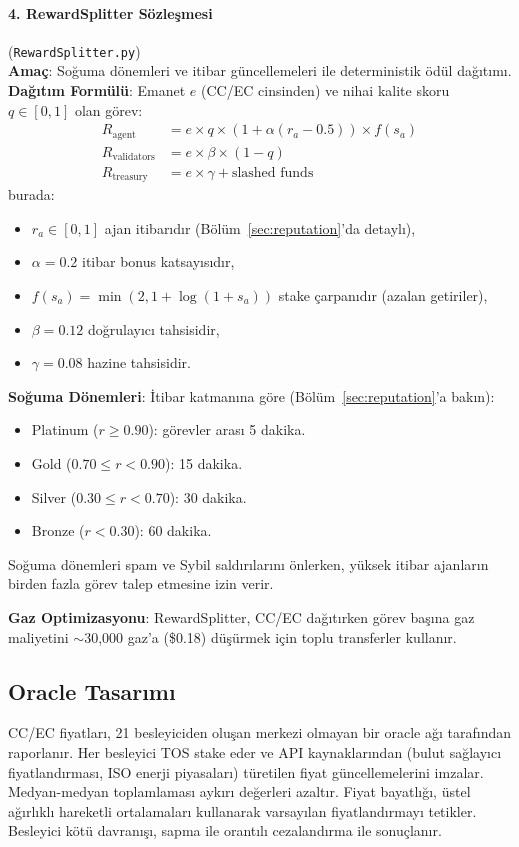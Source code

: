 \documentclass[11pt]{article}
\begin{document}
\paragraph{4. RewardSplitter Sözleşmesi} (\texttt{RewardSplitter.py})\\
\textbf{Amaç}: Soğuma dönemleri ve itibar güncellemeleri ile deterministik ödül dağıtımı.\\
\textbf{Dağıtım Formülü}: Emanet $e$ (CC/EC cinsinden) ve nihai kalite skoru $q \in [0,1]$ olan görev:
\begin{align}
R_{\text{agent}} &= e \times q \times \left(1 + \alpha (r_a - 0.5)\right) \times f(s_a) \label{eq:reward-agent} \\
R_{\text{validators}} &= e \times \beta \times (1-q) \label{eq:reward-validators} \\
R_{\text{treasury}} &= e \times \gamma + \text{slashed funds} \label{eq:reward-treasury}
\end{align}
burada:
\begin{itemize}[noitemsep]
  \item $r_a \in [0,1]$ ajan itibarıdır (Bölüm~\ref{sec:reputation}'da detaylı),
  \item $\alpha = 0.2$ itibar bonus katsayısıdır,
  \item $f(s_a) = \min(2, 1 + \log(1+s_a))$ stake çarpanıdır (azalan getiriler),
  \item $\beta = 0.12$ doğrulayıcı tahsisidir,
  \item $\gamma = 0.08$ hazine tahsisidir.
\end{itemize}
\textbf{Soğuma Dönemleri}: İtibar katmanına göre (Bölüm~\ref{sec:reputation}'a bakın):
\begin{itemize}[noitemsep]
  \item Platinum ($r \geq 0.90$): görevler arası 5 dakika.
  \item Gold ($0.70 \leq r < 0.90$): 15 dakika.
  \item Silver ($0.30 \leq r < 0.70$): 30 dakika.
  \item Bronze ($r < 0.30$): 60 dakika.
\end{itemize}
Soğuma dönemleri spam ve Sybil saldırılarını önlerken, yüksek itibar ajanların birden fazla görev talep etmesine izin verir.

\textbf{Gaz Optimizasyonu}: RewardSplitter, CC/EC dağıtırken görev başına gaz maliyetini $\sim$30,000 gaz'a (\$0.18) düşürmek için toplu transferler kullanır.

\subsection{Oracle Tasarımı}
CC/EC fiyatları, 21 besleyiciden oluşan merkezi olmayan bir oracle ağı tarafından raporlanır. Her besleyici TOS stake eder ve API kaynaklarından (bulut sağlayıcı fiyatlandırması, ISO enerji piyasaları) türetilen fiyat güncellemelerini imzalar. Medyan-medyan toplamlaması aykırı değerleri azaltır. Fiyat bayatlığı, üstel ağırlıklı hareketli ortalamaları kullanarak varsayılan fiyatlandırmayı tetikler. Besleyici kötü davranışı, sapma ile orantılı cezalandırma ile sonuçlanır.
\end{document}

